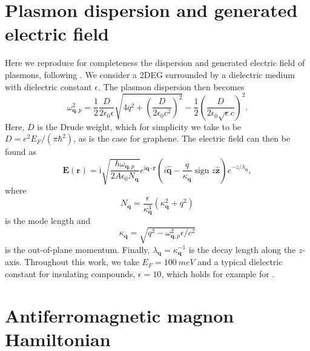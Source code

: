 \documentclass[aps,prb,reprint,twocolumns,superscriptaddress,nofootinbib]{revtex4-2}
\newcommand{\ii}{\mathrm{i}}
\DeclareMathOperator{\sign}{sign}
\newcommand{\epsilonplasmon}{\num{10}}
\newcommand{\Efermi}{\SI{100}{meV}}
\begin{document}
	\section{Plasmon dispersion and generated electric field}
	\label{app:plasmon}
	Here we reproduce for completeness the dispersion and generated electric field of plasmons, following \textcite{ferreiraQuantizationGraphenePlasmons2020}. We consider a 2DEG surrounded by a dielectric medium with dielectric constant $\epsilon$. The plasmon dispersion then becomes
	\begin{equation}
		\omega_{\bm q,p}^2 = \frac{1}{2}\frac{D}{2\epsilon_0 \epsilon}\sqrt{4q^2 + \left(\frac{D}{2\epsilon_0 c^2}\right)^2} - \frac{1}{2}\left(\frac{D}{2\epsilon_0 \sqrt{\epsilon}c}\right)^2.
	\end{equation}
	Here, $D$ is the Drude weight, which for simplicity we take to be $D = e^2 E_F / (\pi\hbar^2)$, as is the case for graphene. The electric field can then be found as
	\begin{equation}
		\bm E(\bm r) = \ii\sqrt{\frac{\hbar\omega_{\bm q,p} }{2A\epsilon_0 N_{\bm q}}} e^{\ii\bm q \cdot \bm r} \left(i \hat{\bm {q}} - \frac{q}{\kappa_{\bm q}}\sign{z}\hat{\bm z} \right) e^{- z/\lambda_{\bm q}},
	\end{equation}
	where 
	\begin{equation}
		N_{\bm q} = \frac{\epsilon}{\kappa^3_{\bm q}}\left(\kappa_{\bm q}^2 + q^2\right)
	\end{equation}
	is the mode length and
	\begin{equation}
		\kappa_{\bm q} = \sqrt{q^2 - \omega_{\bm q,p}^2\epsilon/c^2}
	\end{equation}
	is the out-of-plane momentum.  Finally, $\lambda_{\bm q}=\kappa_{\bm q}^{-1}$ is the decay length along the $z$-axis.
	Throughout this work, we take $E_F=\Efermi$ and a typical  dielectric constant for insulating compounds, $\epsilon=\epsilonplasmon$, which holds for example for   \cite{seehraEffectTemperatureAntiferromagnetic1986}.
	
	
	
	\section{Antiferromagnetic magnon Hamiltonian}
	
	\label{app:hamiltonian}
	
\end{document}
